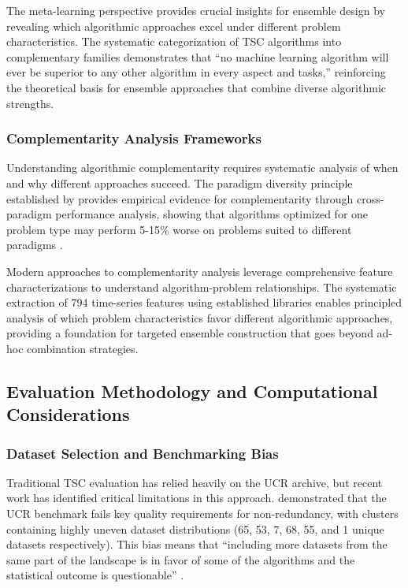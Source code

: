 \documentclass[pdflatex,sn-basic]{sn-jnl}           %
\theoremstyle{thmstyleone}%
\theoremstyle{thmstyletwo}%
\theoremstyle{thmstylethree}%
\begin{document}
The meta-learning perspective provides crucial insights for ensemble design by revealing which algorithmic approaches excel under different problem characteristics. The systematic categorization of TSC algorithms into complementary families \citep[Table~II, p.~9]{tsc-automl} demonstrates that ``no machine learning algorithm will ever be superior to any other algorithm in every aspect and tasks,'' reinforcing the theoretical basis for ensemble approaches that combine diverse algorithmic strengths.

\subsubsection{Complementarity Analysis Frameworks}

Understanding algorithmic complementarity requires systematic analysis of when and why different approaches succeed. The paradigm diversity principle established by \citet[p.~637]{tsc-bakeoff} provides empirical evidence for complementarity through cross-paradigm performance analysis, showing that algorithms optimized for one problem type may perform 5-15\% worse on problems suited to different paradigms \citep[Table~11, p.~647]{tsc-bakeoff}.

Modern approaches to complementarity analysis leverage comprehensive feature characterizations to understand algorithm-problem relationships. The systematic extraction of 794 time-series features using established libraries enables principled analysis of which problem characteristics favor different algorithmic approaches, providing a foundation for targeted ensemble construction that goes beyond ad-hoc combination strategies.

\subsection{Evaluation Methodology and Computational Considerations}

\subsubsection{Dataset Selection and Benchmarking Bias}

Traditional TSC evaluation has relied heavily on the UCR archive, but recent work has identified critical limitations in this approach. \citet[p.~5]{less-is-more} demonstrated that the UCR benchmark fails key quality requirements for non-redundancy, with clusters containing highly uneven dataset distributions (65, 53, 7, 68, 55, and 1 unique datasets respectively). This bias means that ``including more datasets from the same part of the landscape is in favor of some of the algorithms and the statistical outcome is questionable'' \citep[p.~6]{less-is-more}.
\end{document}
